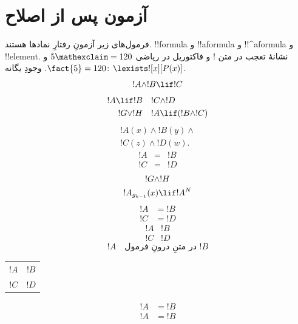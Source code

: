 \documentclass[openany]{memoir}
\begin{document}
\section*{آزمون پس از اصلاح}
\olgreekformulas
\noindent فرمول‌های زیر آزمونِ رفتارِ نمادها هستند.
!!{formula} و !!a{formula} و !!^a{formula} و !!{element}.
نشانهٔ تعجب در متن ! و فاکتوریل در ریاضی $5\mathexclaim=120$ و $\fact{5}=120$.
وجودِ یگانه: $\lexists![x][P(x)]$.
\[
!A \land !B \lif !C
\]
\begin{align*}
!A \lif !B & \quad !C \land !D \\
!G \lor !H & \quad !A \lif (!B \land !C)
\end{align*}
\begin{multline*}
!A(x) \land !B(y) \land {}\\
!C(z) \land !D(w).
\end{multline*}
\begin{eqnarray*}
!A&=&!B\\
!C&=&!D
\end{eqnarray*}
\begin{gather*}
!G\land !H\\
!A_{g_{k-1}}(x)\lif !A^N
\end{gather*}
\[\begin{aligned}!A&=!B\\!C&=!D\end{aligned}\]
\[\begin{array}{cc}!A&!B\\!C&!D\end{array}\]
\begin{equation}!A\quad\text{در متنِ درونِ فرمول $!B$}\tag{آزمون $!C$}\end{equation}
\begin{tabular}{cc}
$!A$ & $!B$\\
$!C$ & $!D$
\end{tabular}
\par
\ollatinformulas
\begin{align*}!A&=!B\end{align*}
\olalphagreekformulas
\begin{align*}!A&=!B\end{align*}
\olgreekformulas
\clearpage
\begingroup
\end{document}
